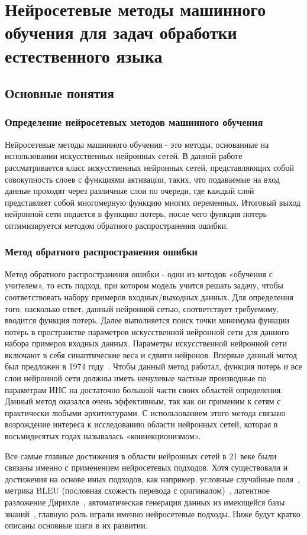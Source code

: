 \chapter{Нейросетевые методы машинного обучения для задач обработки естественного языка}\label{ch:nn} 
 
\section{Основные понятия}
\subsection{Определение нейросетевых методов машинного обучения}
Нейросетевые методы машинного обучения - это методы, основанные на использовании искусственных нейронных сетей. В данной работе рассматривается класс искусственных нейронных сетей, представляющих собой совокупность слоев с функциями активации, таких, что подаваемые на вход данные проходят через различные слои по очереди, где каждый слой представляет собой многомерную функцию многих переменных. Итоговый выход нейронной сети подается в функцию потерь, после чего функция потерь оптимизируется методом обратного распространения ошибки. 
\subsection{Метод обратного распространения ошибки}
Метод обратного распространения ошибки - один из методов «обучения с учителем», то есть подход, при котором модель учится решать задачу, чтобы соответствовать набору примеров входных/выходных данных. Для определения того, насколько ответ, данный нейронной сетью, соответствует требуемому, вводится функция потерь. Далее выполняется поиск точки минимума функции потерь в пространстве параметров искусственной нейронной сети для данного набора примеров входных данных. Параметры искусственной нейронной сети включают в себя синаптические веса и сдвиги нейронов. Впервые данный метод был предложен в 1974 году~\cite{werbos_1974}. Чтобы данный метод работал, функция потерь и все слои нейронной сети должны иметь ненулевые частные производные по параметрам ИНС на достаточно большой части своих областей определения.
Данный метод оказался очень эффективным, так как он применим к сетям с практически любыми архитектурами. С использованием этого метода связано возрождение интереса к исследованию области нейронных сетей, которая в восьмидесятых годах называлась «коннекционизмом». 

Все самые главные достижения в области нейронных сетей в 21 веке были связаны именно с применением нейросетевых подходов. Хотя существовали и достижения на основе иных подходов, как например, условные случайные поля~\cite{lafferty_2004}, метрика BLEU (пословная схожесть перевода с оригиналом)~\cite{papineni_2001}, латентное разложение Дирихле~\cite{blei_2003}, автоматическая генерация данных из имеющейся базы знаний~\cite{mintz_2009}, главную роль играли именно нейросетевые подходы. Ниже будут кратко описаны основные шаги в их развитии.

